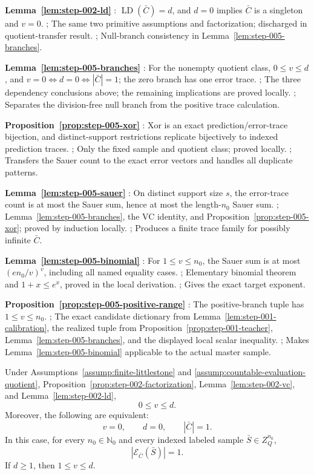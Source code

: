 \noindent\textbf{ Lemma~\ref{lem:step-002-ld} }:  \(\operatorname{LD}(\bar C)=d\), and \(d=0\) implies \(\bar C\) is a singleton and \(v=0\). ;  The same two primitive assumptions and  factorization; discharged in  quotient-transfer result. ;  Null-branch consistency in Lemma~\ref{lem:step-005-branches}. \par
\noindent\textbf{ Lemma~\ref{lem:step-005-branches} }:  For the nonempty quotient class, \(0\le v\le d\), and \(v=0\iff d=0\iff|\bar C|=1\); the zero branch has one error trace. ;  The three  dependency conclusions above; the remaining implications are proved locally. ;  Separates the division-free null branch from the positive trace calculation. \par
\noindent\textbf{ Proposition~\ref{prop:step-005-xor} }:  Xor is an exact prediction/error-trace bijection, and distinct-support restrictions replicate bijectively to indexed prediction traces. ;  Only the fixed sample and  quotient class; proved locally. ;  Transfers the Sauer count to the exact error vectors and handles all duplicate patterns. \par
\noindent\textbf{ Lemma~\ref{lem:step-005-sauer} }:  On distinct support size \(s\), the error-trace count is at most the Sauer sum, hence at most the length-\(n_0\) Sauer sum. ;  Lemma~\ref{lem:step-005-branches}, the  VC identity, and Proposition~\ref{prop:step-005-xor}; proved by induction locally. ;  Produces a finite trace family for possibly infinite \(\bar C\). \par
\noindent\textbf{ Lemma~\ref{lem:step-005-binomial} }:  For \(1\le v\le n_0\), the Sauer sum is at most \((e n_0/v)^v\), including all named equality cases. ;  Elementary binomial theorem and \(1+x\le e^x\), proved in the local derivation. ;  Gives the exact target exponent. \par
\noindent\textbf{ Proposition~\ref{prop:step-005-positive-range} }:  The  positive-branch tuple has \(1\le v\le n_0\). ;  The exact candidate dictionary from Lemma~\ref{lem:step-001-calibration}, the realized tuple from Proposition~\ref{prop:step-001-teacher}, Lemma~\ref{lem:step-005-branches}, and the displayed local scalar inequality. ;  Makes Lemma~\ref{lem:step-005-binomial} applicable to the actual master sample. \par



\begin{lemma}\label{lem:step-005-branches}
Under Assumptions~\ref{assump:finite-littlestone} and
\ref{assump:countable-evaluation-quotient}, Proposition~\ref{prop:step-002-factorization},
Lemma~\ref{lem:step-002-vc}, and Lemma~\ref{lem:step-002-ld},
\[
0\le v\le d.
\]
Moreover, the following are equivalent:
\[
v=0,\qquad d=0,\qquad |\bar C|=1.
\tag{1}
\]
In this case, for every \(n_0\in\mathbb N_0\) and every indexed labeled
sample \(\bar S\in Z_Q^{n_0}\),
\[
|\mathcal E_{\bar C}(\bar S)|=1.
\tag{2}
\]
If \(d\ge1\), then \(1\le v\le d\).


\end{lemma}


